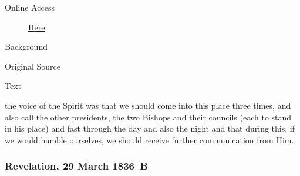 				\begin{description}
					\item[Online Access] \href{https://www.josephsmithpapers.org/paper-summary/revelation-29-march-1836-a/1}{Here}
				\end{description}
				
				\begin{description}
					\item[Background]
				\end{description}
				
				
				\begin{description}
					\item[Original Source]
				\end{description}
				
				
				\begin{description}
					\item[Text]
				\end{description}
				
					the voice of the Spirit was that we should come into this place three times, and also call the other presidents, the two Bishops and their councils (each to stand in his place) and fast through the day and also the night and that during this, if we would humble ourselves, we should receive further communication from Him.
					
		\subsubsection{Revelation, 29 March 1836--B}
			\label{EMS-1836-JS-29-MAR-1836-B}
			
